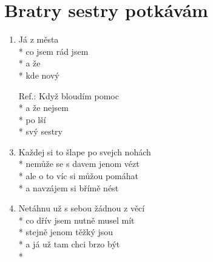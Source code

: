 \section{Bratry sestry potkávám} %
\begin{enumerate}
\item Já  z města   \\*
co  jsem rád jsem  \\*
a   že   \\*
kde  nový   
\item[Ref.:]  Když bloudím  pomoc  \\*
a  že nejsem  \\*
po  lší  \\*
svý  sestry  
\item Každej si to šlape po svejch nohách \\*
nemůže se s davem jenom vézt \\*
ale o to víc si můžou pomáhat \\*
a navzájem si břímě nést 
\item Netáhnu už s sebou žádnou z věcí \\*
co dřív jsem nutně musel mít \\*
stejně jenom těžký jsou \\*
a já už tam chci brzo být \\*
\end{enumerate}

